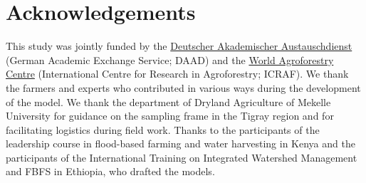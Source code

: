 \documentclass[]{elsarticle} %
\begin{document}
\hypertarget{acknowledgements}{%
\section*{Acknowledgements}\label{acknowledgements}}

This study was jointly funded by the \href{https://www.daad.de/en/}{Deutscher Akademischer Austauschdienst} (German Academic Exchange Service; DAAD) and the \href{http://www.worldagroforestry.org/}{World Agroforestry Centre} (International Centre for Research in Agroforestry; ICRAF). We thank the farmers and experts who contributed in various ways during the development of the model. We thank the department of Dryland Agriculture of Mekelle University for guidance on the sampling frame in the Tigray region and for facilitating logistics during field work. Thanks to the participants of the leadership course in flood-based farming and water harvesting in Kenya and the participants of the International Training on Integrated Watershed Management and FBFS in Ethiopia, who drafted the models.
\end{document}
